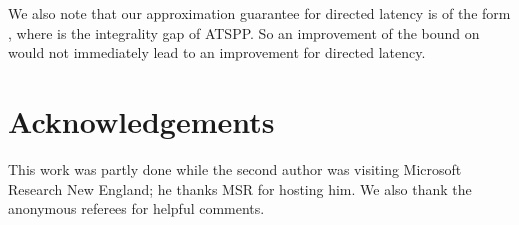 \documentclass[11pt]{article}
\begin{document}
We also note that our approximation guarantee for directed latency is of the form , where  is the integrality gap of ATSPP. So an improvement of the bound on  would not immediately lead to an improvement for directed latency. 

\section*{Acknowledgements} This work was partly done while the second author was visiting Microsoft Research New England; he thanks MSR for hosting him. We also thank the anonymous referees for helpful comments.





\end{document}

